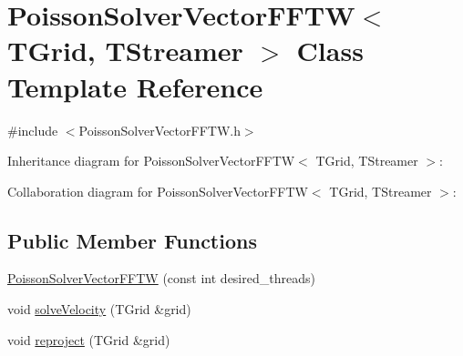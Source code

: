 \hypertarget{class_poisson_solver_vector_f_f_t_w}{}\section{Poisson\+Solver\+Vector\+F\+F\+T\+W$<$ T\+Grid, T\+Streamer $>$ Class Template Reference}
\label{class_poisson_solver_vector_f_f_t_w}


{\ttfamily \#include $<$Poisson\+Solver\+Vector\+F\+F\+T\+W.\+h$>$}



Inheritance diagram for Poisson\+Solver\+Vector\+F\+F\+T\+W$<$ T\+Grid, T\+Streamer $>$\+:


Collaboration diagram for Poisson\+Solver\+Vector\+F\+F\+T\+W$<$ T\+Grid, T\+Streamer $>$\+:
\subsection*{Public Member Functions}
\begin{DoxyCompactItemize}
\item 
\hyperlink{class_poisson_solver_vector_f_f_t_w_ab2a8369a7aab2b69a26679d1a4f1ba95}{Poisson\+Solver\+Vector\+F\+F\+T\+W} (const int desired\+\_\+threads)
\item 
void \hyperlink{class_poisson_solver_vector_f_f_t_w_add12bb6cb209a6cd2be3c01bd8ee4ec4}{solve\+Velocity} (T\+Grid \&grid)
\item 
void \hyperlink{class_poisson_solver_vector_f_f_t_w_a517b6b196f4cc6fe328e52824d016e0c}{reproject} (T\+Grid \&grid)
\end{DoxyCompactItemize}
